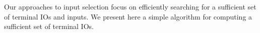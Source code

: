 \documentclass[runningheads,a4paper]{llncs}
\begin{document}


Our approaches to input selection focus on efficiently searching for a
sufficient set of terminal IOs and inputs.
%
%
%
We present here a simple algorithm for computing a sufficient
set of terminal IOs.  %
\end{document}
